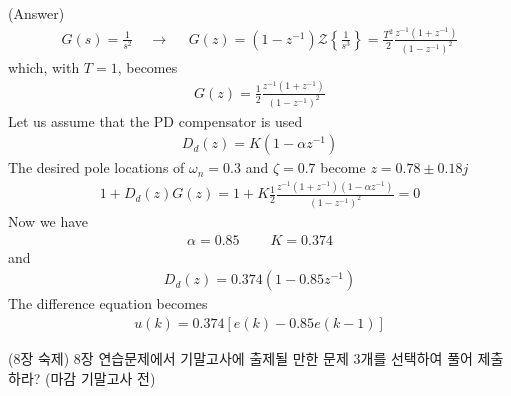 \documentclass[landscape,14pt]{oblivoir}
\begin{document}
(Answer) 
\begin{align*}
	G(s) = \frac{1}{s^2}   ~~~~~\rightarrow~~~~~~ G(z) = (1-z^{-1}) \mathcal{Z} \left\{ \frac{1}{s^3} \right\} = \frac{T^2}{2} \frac{z^{-1}(1+z^{-1})}{(1-z^{-1})^2}
\end{align*}
which, with $T=1$, becomes
\begin{align*}
	G(z) = \frac{1}{2} \frac{z^{-1}(1+z^{-1})}{(1-z^{-1})^2}
\end{align*}
Let us assume that the PD compensator is used
\begin{align*}
	D_d(z) = K (1- \alpha z^{-1})
\end{align*}
The desired pole locations of $\omega_n = 0.3$ and $\zeta = 0.7$ become $z=0.78 \pm 0.18j$ 
\begin{align*}
	1 + D_d(z) G(z) = 1 + K\frac{1}{2} \frac{z^{-1}(1+z^{-1})(1- \alpha z^{-1})}{(1-z^{-1})^2} =0 
\end{align*}
Now we have 
\begin{align*}
	\alpha = 0.85 ~~~~~~~~~~K = 0.374
\end{align*}
and 
\begin{align*}
	D_d(z) = 0.374 (1- 0.85 z^{-1})
\end{align*}
The difference equation becomes
\begin{align*}
	u(k) =  0.374 [e(k) - 0.85 e(k-1)] 
\end{align*}

(8장 숙제) 8장 연습문제에서 기말고사에 출제될 만한 문제 3개를 선택하여 풀어 제출하라? (마감 기말고사 전) 
% 
\newpage
\end{document}
